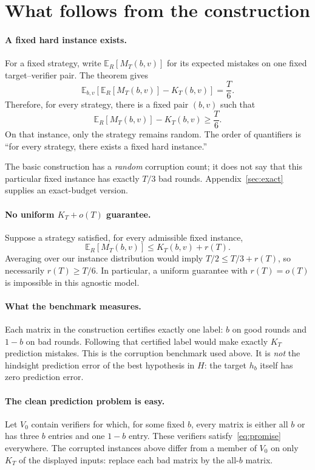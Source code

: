 \documentclass[11pt]{article}
\newcommand{\E}{\mathbb{E}}
\theoremstyle{remark}
\begin{document}
\clearpage
\section{What follows from the construction}

\paragraph{A fixed hard instance exists.}
For a fixed strategy, write $\E_R[M_T(b,v)]$ for its expected mistakes on
one fixed target--verifier pair. The theorem gives
\[
 \E_{b,v}\!\left[\E_R[M_T(b,v)]-K_T(b,v)\right]=\frac{T}{6}.
\]
Therefore, for every strategy, there is a fixed pair $(b,v)$ such that
\begin{equation}\label{eq:fixed-excess}
           \E_R[M_T(b,v)]-K_T(b,v)\ge\frac{T}{6}.
\end{equation}
On that instance, only the strategy remains random. The order of quantifiers
is ``for every strategy, there exists a fixed hard instance.''

The basic construction has a \emph{random} corruption count; it does not say
that this particular fixed instance has exactly $T/3$ bad rounds.
Appendix~\ref{sec:exact} supplies an exact-budget version.

\paragraph{No uniform $K_T+o(T)$ guarantee.}
Suppose a strategy satisfied, for every admissible fixed instance,
\[
            \E_R[M_T(b,v)]\le K_T(b,v)+r(T).
\]
Averaging over our instance distribution would imply
$T/2\le T/3+r(T)$, so necessarily $r(T)\ge T/6$. In particular, a
uniform guarantee with $r(T)=o(T)$ is impossible in this agnostic model.

\paragraph{What the benchmark measures.}
Each matrix in the construction certifies exactly one label: $b$ on good
rounds and $1-b$ on bad rounds. Following that certified label would make
exactly $K_T$ prediction mistakes. This is the corruption benchmark used
above. It is \emph{not} the hindsight prediction error of the best hypothesis
in $H$: the target $h_b$ itself has zero prediction error.

\paragraph{The clean prediction problem is easy.}
Let $V_0$ contain verifiers for which, for some fixed $b$, every matrix is
either all $b$ or has three $b$ entries and one $1-b$ entry. These verifiers
satisfy~\eqref{eq:promise} everywhere. The corrupted instances above differ
from a member of $V_0$ on only $K_T$ of the displayed inputs: replace each bad
matrix by the all-$b$ matrix.
\end{document}
